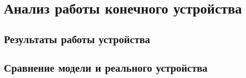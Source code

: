 \chapter{Анализ работы конечного устройства}
\label{cha:chap6}

\section{Результаты работы устройства}

\section{Сравнение модели и реального устройства}
